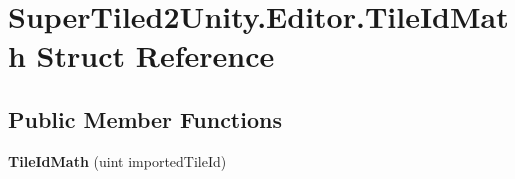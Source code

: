 \hypertarget{struct_super_tiled2_unity_1_1_editor_1_1_tile_id_math}{}\section{Super\+Tiled2\+Unity.\+Editor.\+Tile\+Id\+Math Struct Reference}
\label{struct_super_tiled2_unity_1_1_editor_1_1_tile_id_math}
\subsection*{Public Member Functions}
\begin{DoxyCompactItemize}
\item 
\mbox{\label{struct_super_tiled2_unity_1_1_editor_1_1_tile_id_math_afb6643cf8d2b98af791bc218b1f35734}} 
{\bfseries Tile\+Id\+Math} (uint imported\+Tile\+Id)
\end{DoxyCompactItemize}

